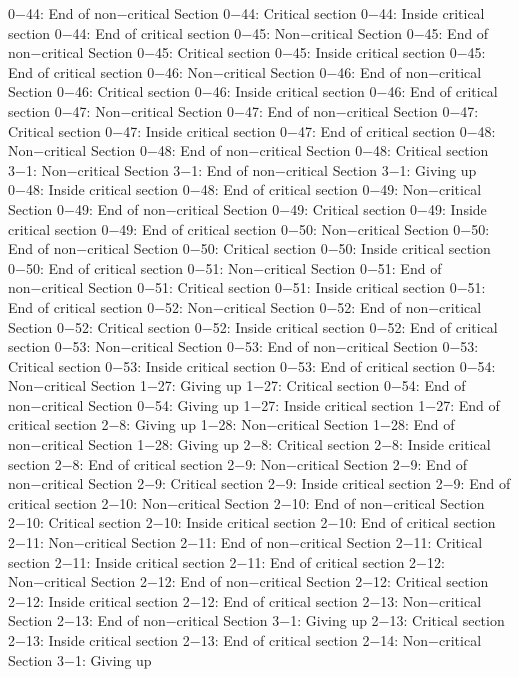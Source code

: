 0−44: End of non−critical Section
0−44: Critical section
0−44: Inside critical section
0−44: End of critical section
0−45: Non−critical Section
0−45: End of non−critical Section
0−45: Critical section
0−45: Inside critical section
0−45: End of critical section
0−46: Non−critical Section
0−46: End of non−critical Section
0−46: Critical section
0−46: Inside critical section
0−46: End of critical section
0−47: Non−critical Section
0−47: End of non−critical Section
0−47: Critical section
0−47: Inside critical section
0−47: End of critical section
0−48: Non−critical Section
0−48: End of non−critical Section
0−48: Critical section
3−1: Non−critical Section
3−1: End of non−critical Section
3−1: Giving up
0−48: Inside critical section
0−48: End of critical section
0−49: Non−critical Section
0−49: End of non−critical Section
0−49: Critical section
0−49: Inside critical section
0−49: End of critical section
0−50: Non−critical Section
0−50: End of non−critical Section
0−50: Critical section
0−50: Inside critical section
0−50: End of critical section
0−51: Non−critical Section
0−51: End of non−critical Section
0−51: Critical section
0−51: Inside critical section
0−51: End of critical section
0−52: Non−critical Section
0−52: End of non−critical Section
0−52: Critical section
0−52: Inside critical section
0−52: End of critical section
0−53: Non−critical Section
0−53: End of non−critical Section
0−53: Critical section
0−53: Inside critical section
0−53: End of critical section
0−54: Non−critical Section
1−27: Giving up
1−27: Critical section
0−54: End of non−critical Section
0−54: Giving up
1−27: Inside critical section
1−27: End of critical section
2−8: Giving up
1−28: Non−critical Section
1−28: End of non−critical Section
1−28: Giving up
2−8: Critical section
2−8: Inside critical section
2−8: End of critical section
2−9: Non−critical Section
2−9: End of non−critical Section
2−9: Critical section
2−9: Inside critical section
2−9: End of critical section
2−10: Non−critical Section
2−10: End of non−critical Section
2−10: Critical section
2−10: Inside critical section
2−10: End of critical section
2−11: Non−critical Section
2−11: End of non−critical Section
2−11: Critical section
2−11: Inside critical section
2−11: End of critical section
2−12: Non−critical Section
2−12: End of non−critical Section
2−12: Critical section
2−12: Inside critical section
2−12: End of critical section
2−13: Non−critical Section
2−13: End of non−critical Section
3−1: Giving up
2−13: Critical section
2−13: Inside critical section
2−13: End of critical section
2−14: Non−critical Section
3−1: Giving up
